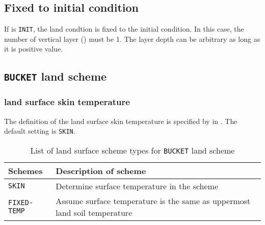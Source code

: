 \subsection{Fixed to initial condition}

If  is \verb|INIT|, the land condtion is fixed to the initial condition.
In this case, the number of vertical layer () must be 1.
The layer depth can be arbitrary as long as it is positive value.



\subsection{\texttt{BUCKET} land scheme}

\subsubsection{land surface skin temperature}

The definition of the land surface skin temperature is specified by  in .
The default setting is \verb|SKIN|.
%
\begin{table}[hbt]
\begin{center}
  \caption{List of land surface scheme types for \texttt{BUCKET} land scheme}
  \label{tab:nml_land_sfc}
  \begin{tabularx}{150mm}{lX} \hline
    \rowcolor[gray]{0.9}  Schemes & Description of scheme \\ \hline
      \verb|SKIN|       & Determine surface temperature in the scheme \\
      \verb|FIXED-TEMP| & Assume surface temperature is the same as uppermost land soil temperature \\
    \hline
  \end{tabularx}
\end{center}
\end{table}


